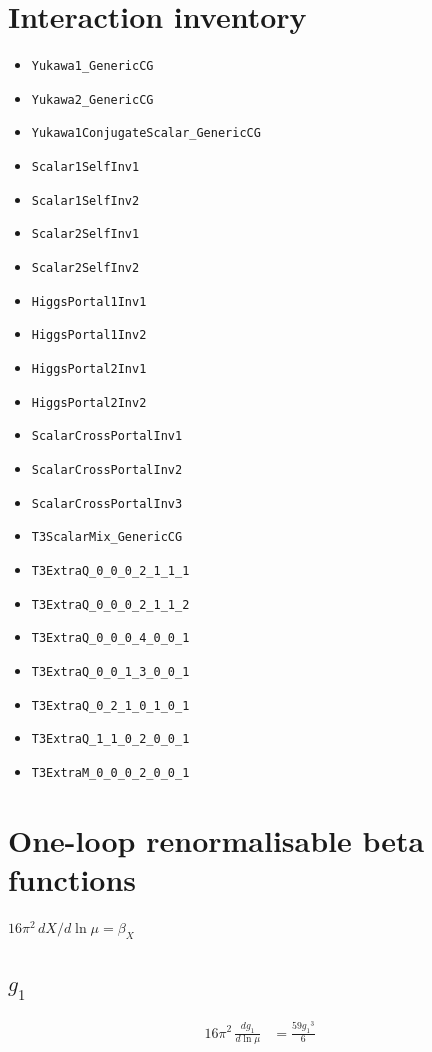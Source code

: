 \documentclass[10pt,a4paper]{article}
\begin{document}
\section*{Interaction inventory}
\begin{itemize}
\item \texttt{Yukawa1\_GenericCG}
\item \texttt{Yukawa2\_GenericCG}
\item \texttt{Yukawa1ConjugateScalar\_GenericCG}
\item \texttt{Scalar1SelfInv1}
\item \texttt{Scalar1SelfInv2}
\item \texttt{Scalar2SelfInv1}
\item \texttt{Scalar2SelfInv2}
\item \texttt{HiggsPortal1Inv1}
\item \texttt{HiggsPortal1Inv2}
\item \texttt{HiggsPortal2Inv1}
\item \texttt{HiggsPortal2Inv2}
\item \texttt{ScalarCrossPortalInv1}
\item \texttt{ScalarCrossPortalInv2}
\item \texttt{ScalarCrossPortalInv3}
\item \texttt{T3ScalarMix\_GenericCG}
\item \texttt{T3ExtraQ\_0\_0\_0\_2\_1\_1\_1}
\item \texttt{T3ExtraQ\_0\_0\_0\_2\_1\_1\_2}
\item \texttt{T3ExtraQ\_0\_0\_0\_4\_0\_0\_1}
\item \texttt{T3ExtraQ\_0\_0\_1\_3\_0\_0\_1}
\item \texttt{T3ExtraQ\_0\_2\_1\_0\_1\_0\_1}
\item \texttt{T3ExtraQ\_1\_1\_0\_2\_0\_0\_1}
\item \texttt{T3ExtraM\_0\_0\_0\_2\_0\_0\_1}
\end{itemize}
\clearpage
\section*{One-loop renormalisable beta functions}
$16\pi^2\,dX/d\ln\mu=\beta_X$
\subsection*{$g_1$}
\begin{align*}
16\pi^2\,\frac{d g_1}{d\ln\mu} &=\frac{59 {g_1}^3}{6} \\
\end{align*}
\end{document}
